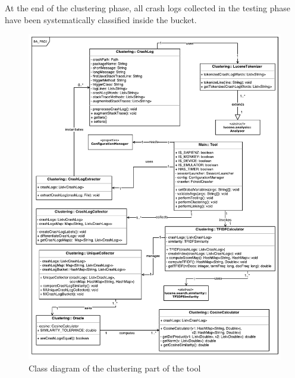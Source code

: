 \hspace{-1.75em} At the end of the clustering phase, all crash logs collected in the testing phase have been systematically classified inside the bucket. 

\clearpage

\begin{figure}[H]
\centering 
\includegraphics[width=\columnwidth]{diagrams/clustering} 
\caption{Class diagram of the clustering part of the tool }
\label{linking}
\end{figure}













